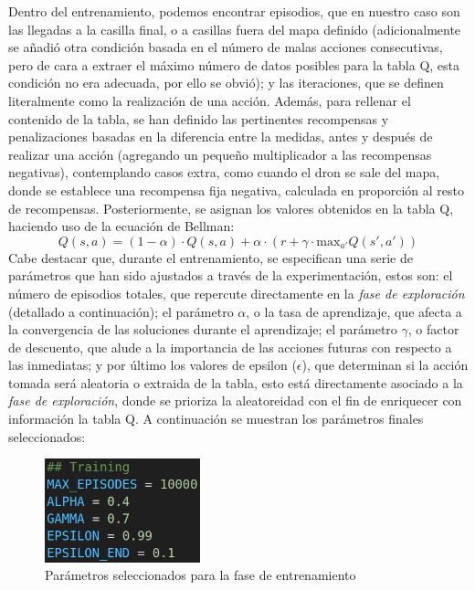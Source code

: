 Dentro del entrenamiento, podemos encontrar episodios, que en nuestro caso son las llegadas a la casilla final, o a casillas fuera del mapa definido (adicionalmente se añadió otra condición basada en el número de malas acciones consecutivas, pero de cara a extraer el máximo número de datos posibles para la tabla Q, esta condición no era adecuada, por ello se obvió); y las iteraciones, que se definen literalmente como la realización de una acción. Además, para rellenar el contenido de la tabla, se han definido las pertinentes recompensas y penalizaciones basadas en la diferencia entre la medidas, antes y después de realizar una acción (agregando un pequeño multiplicador a las recompensas negativas), contemplando casos extra, como cuando el dron se sale del mapa, donde se establece una recompensa fija negativa, calculada en proporción al resto de recompensas. Posteriormente, se asignan los valores obtenidos en la tabla Q, haciendo uso de la ecuación de Bellman:
\begin{equation}
    Q(s, a) = (1 - \alpha) \cdot Q(s, a) + \alpha \cdot \left(r + \gamma \cdot \mathrm{max}_{a'} Q(s', a')\right)
\end{equation}
Cabe destacar que, durante el entrenamiento, se especifican una serie de parámetros que han sido ajustados a través de la experimentación, estos son: el número de episodios totales, que repercute directamente en la \emph{fase de exploración} (detallado a continuación); el parámetro $\alpha$, o la tasa de aprendizaje, que afecta a la convergencia de las soluciones durante el aprendizaje; el parámetro $\gamma$, o factor de descuento, que alude a la importancia de las acciones futuras con respecto a las inmediatas; y por último los valores de epsilon ($\epsilon$), que determinan si la acción tomada será aleatoria o extraida de la tabla, esto está directamente asociado a la \emph{fase de exploración}, donde se prioriza la aleatoreidad con el fin de enriquecer con información la tabla Q. A continuación se muestran los parámetros finales seleccionados:

\begin{figure} [t]
    \begin{center}
    \includegraphics[height=3cm]{imagenes/cap4/7_params.png}
    \end{center}
    \caption[Parámetros seleccionados para la fase de entrenamiento]{Parámetros seleccionados para la fase de entrenamiento}
    \label{fig:params}
\end{figure}

